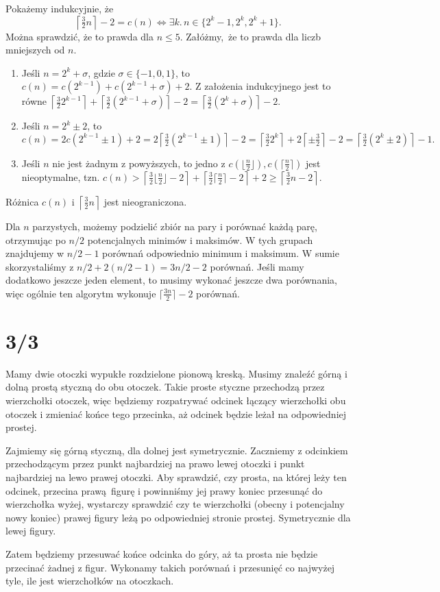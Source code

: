 \documentclass[a4paper, 12pt]{article}
\newcommand{\+}{\enspace}
\begin{document}
Pokażemy indukcyjnie, że
$$\left\lceil \tfrac{3}{2}n\right\rceil-2 = c(n) ⇔ ∃k.\, n ∈ \{ 2^k-1, 2^k, 2^k+1 \}.$$
Można sprawdzić, że to prawda dla $n≤5$.
Załóżmy, że to prawda dla liczb mniejszych od $n$.

\begin{enumerate}
	\item Jeśli $n=2^k+σ$, gdzie $σ∈\{-1,0,1\}$, to $c(n) = c(2^{k-1})+c(2^{k-1}+σ)+2.$
		Z założenia indukcyjnego jest to równe
		$\left\lceil \tfrac{3}{2}2^{k-1} \right\rceil
		+\left\lceil \tfrac{3}{2}(2^{k-1}+σ) \right\rceil - 2
		=\left\lceil \tfrac{3}{2}(2^{k}+σ) \right\rceil - 2$.
	\item Jeśli $n=2^k±2$, to $c(n) = 2c(2^{k-1}±1)+2 =
		2\left\lceil \tfrac{3}{2}(2^{k-1}±1) \right\rceil-2 =
		\left\lceil \tfrac{3}{2}2^{k} \right\rceil + 2\left\lceil ±\tfrac{3}{2}\right\rceil-2
		=\left\lceil \tfrac{3}{2}(2^{k}±2) \right\rceil -1.$
	\item Jeśli $n$ nie jest żadnym z powyższych, to jedno z
		$c\left(\lfloor \tfrac{n}{2} \rfloor\right)
		,c\left(\lceil \tfrac{n}{2} \rceil\right)$ jest nieoptymalne, tzn.
		$c(n) >
		\left\lceil\tfrac{3}{2}\lfloor \tfrac{n}{2} \rfloor - 2\right\rceil
		+\left\lceil\tfrac{3}{2}\lceil \tfrac{n}{2} \rceil - 2\right\rceil + 2
		≥ \left\lceil \tfrac{3}{2}n - 2 \right\rceil$.
\end{enumerate}

Różnica $c(n)$ i $\left\lceil \tfrac{3}{2}n\right\rceil$ jest nieograniczona.

Dla $n$ parzystych, możemy podzielić zbiór na pary i porównać każdą parę,
otrzymując po $n/2$ potencjalnych minimów i maksimów.
W tych grupach znajdujemy w $n/2-1$ porównań odpowiednio minimum i maksimum.
W sumie skorzystaliśmy z $n/2 + 2(n/2-1) = 3n/2 - 2$ porównań.
Jeśli mamy dodatkowo jeszcze jeden element, to musimy wykonać jeszcze dwa porównania,
więc ogólnie ten algorytm wykonuje $\lceil \tfrac{3n}{2} \rceil - 2$ porównań.

\section*{3/3}
Mamy dwie otoczki wypukłe rozdzielone pionową kreską.
Musimy znaleźć górną i dolną prostą styczną do obu otoczek.
Takie proste styczne przechodzą przez wierzchołki otoczek, więc
będziemy rozpatrywać odcinek łączący wierzchołki obu otoczek i
zmieniać końce tego przecinka, aż odcinek będzie leżał na odpowiedniej prostej.

Zajmiemy się górną styczną, dla dolnej jest symetrycznie.
Zaczniemy z odcinkiem przechodzącym przez punkt najbardziej na prawo lewej otoczki
i punkt najbardziej na lewo prawej otoczki.
Aby sprawdzić, czy prosta, na której leży ten odcinek, przecina prawą figurę
i powinniśmy jej prawy koniec przesunąć do wierzchołka wyżej, wystarczy
sprawdzić czy te wierzchołki (obecny i potencjalny nowy koniec) prawej figury
leżą po odpowiedniej stronie prostej.
Symetrycznie dla lewej figury.

Zatem będziemy przesuwać końce odcinka do góry, aż ta prosta nie będzie przecinać
żadnej z figur.
Wykonamy takich porównań i przesunięć co najwyżej tyle, ile jest wierzchołków
na otoczkach.
\end{document}
